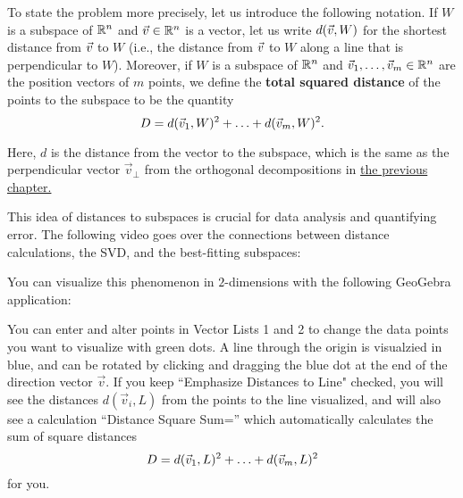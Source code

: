 \documentclass{ximera}
\begin{document}
To state the problem more precisely, let us introduce the following
notation. If $W$ is a subspace of $\mathbb{R}^n$ and $\vec{v}\in\mathbb{R}^n$ is a
vector, let us write $d(\vec{v},W)$ for the shortest distance from
$\vec{v}$ to $W$ (i.e., the distance from $\vec{v}$ to $W$ along a
line that is perpendicular to $W$). Moreover, if $W$ is a subspace of
$\mathbb{R}^n$ and $\vec{v}_1,\ldots,\vec{v}_m\in\mathbb{R}^n$ are the position
vectors of $m$ points, we define the \textbf{total squared distance}%
%
%
%
 of the points to
the subspace to be the quantity
\begin{equation*}
  D = d(\vec{v}_1,W)^2 + \ldots + d(\vec{v}_m,W)^2.
\end{equation*}


Here, $d$ is the distance from the vector to the subspace, which is the same as the perpendicular vector $\vec{v}_\perp$ from the orthogonal decompositions in \href{https://ximera.osu.edu/appliedlinearalgebra/c5ChapterFive/learningActivities/m5LearningActivities/m5DotProduct/orthogonalityThree}{the previous chapter.}

This idea of distances to subspaces is crucial for data analysis and quantifying error. The following video goes over the connections between distance calculations, the SVD, and the best-fitting subspaces:

\begin{center}
\end{center}

You can visualize this phenomenon in $2$-dimensions with the following GeoGebra application:

\begin{center}
\end{center}



You can enter and alter points in Vector Lists 1 and 2 to change the data points you want to visualize with green dots. A line through the origin is visualzied in blue, and can be rotated by clicking and dragging the blue dot at the end of the direction vector $\vec{v}$. If you keep ``Emphasize Distances to Line" checked, you will see the distances $d(\vec{v}_i,L)$ from the points to the line visualized, and will also see a calculation ``Distance Square Sum='' which automatically calculates the sum of square distances \begin{equation*}
  D = d(\vec{v}_1,L)^2 + \ldots + d(\vec{v}_m,L)^2
\end{equation*} for you.
\end{document}

